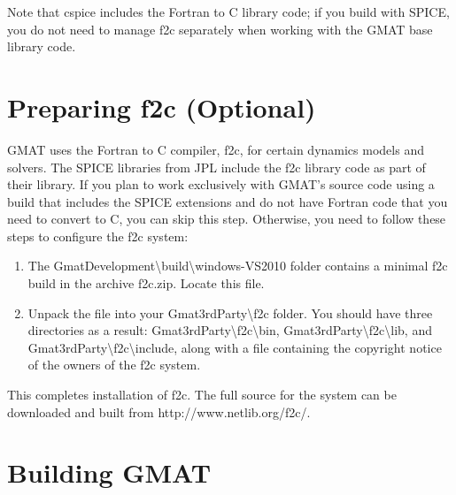 \documentclass[letterpaper,10pt]{article}%
\begin{document}
\noindent Note that cspice includes the Fortran to C library code; if you build with SPICE, you do not need to manage f2c separately when working with the GMAT base library code.

\section{Preparing f2c (Optional)}

GMAT uses the Fortran to C compiler, f2c, for certain dynamics models and solvers.  The SPICE libraries from JPL include the f2c library code as part of their library.  If you plan to work exclusively with GMAT's source code using a build that includes the SPICE extensions and do not have Fortran code that you need to convert to C, you can skip this step.  Otherwise, you need to follow these steps to configure the f2c system:

\begin{enumerate}
\item The GmatDevelopment\textbackslash build\textbackslash windows-VS2010 folder contains a minimal f2c build in the archive f2c.zip.  Locate this file.
\item Unpack the file into your Gmat3rdParty\textbackslash f2c folder.  You should have three directories as a result: Gmat3rdParty\textbackslash f2c\textbackslash bin, Gmat3rdParty\textbackslash f2c\textbackslash lib, and Gmat3rdParty\textbackslash f2c\textbackslash include, along with a file containing the copyright notice of the owners of the f2c system.
\end{enumerate}

This completes installation of f2c.  The full source for the system can be downloaded and built from http://www.netlib.org/f2c/.

\section{Building GMAT}
\end{document}
